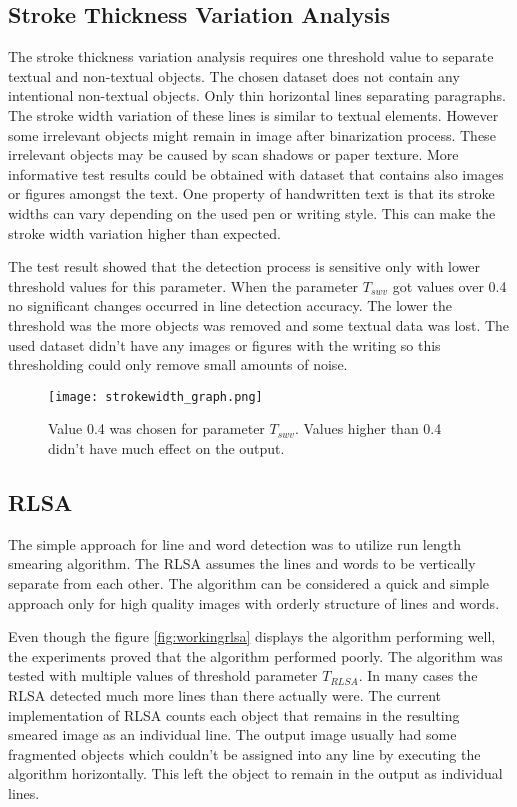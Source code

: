 \documentclass{article}
\begin{document}
    \subsection{Stroke Thickness Variation Analysis}
      The stroke thickness variation analysis requires one threshold value to separate textual and non-textual objects. The chosen dataset does not contain any intentional non-textual objects. Only thin horizontal lines separating paragraphs. The stroke width variation of these lines is similar to textual elements. However some irrelevant objects might remain in image after binarization process. These irrelevant objects may be caused by scan shadows or paper texture. More informative test results could be obtained with dataset that contains also images or figures amongst the text. One property of handwritten text is that its stroke widths can vary depending on the used pen or writing style. This can make the stroke width variation higher than expected.

      The test result showed that the detection process is sensitive only with lower threshold values for this parameter. When the parameter $T_{swv}$ got values over 0.4 no significant changes occurred in line detection accuracy. The lower the threshold was the more objects was removed and some textual data was lost. The used dataset didn't have any images or figures with the writing so this thresholding could only remove small amounts of noise.

      \begin{figure}[!ht]
        \centering
        \texttt{[image: strokewidth\_graph.png]}
        \caption{Value 0.4 was chosen for parameter $T_{swv}$. Values higher than 0.4 didn't have much effect on the output. \label{fig:strokewidthresults}}
      \end{figure}

    \subsection{RLSA}
      The simple approach for line and word detection was to utilize run length smearing algorithm. The RLSA assumes the lines and words to be vertically separate from each other. The algorithm can be considered a quick and simple approach only for high quality images with orderly structure of lines and words.

      Even though the figure \ref{fig:workingrlsa} displays the algorithm performing well, the experiments proved that the algorithm performed poorly. The algorithm was tested with multiple values of threshold parameter $T_{RLSA}$. In many cases the RLSA detected much more lines than there actually were. The current implementation of RLSA counts each object that remains in the resulting smeared image as an individual line. The output image usually had some fragmented objects which couldn't be assigned into any line by executing the algorithm horizontally. This left the object to remain in the output as individual lines.
\end{document}
